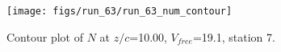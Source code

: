 \begin{figure}[H]
\centering
\texttt{[image: figs/run\_63/run\_63\_num\_contour]}
\caption{Contour plot of $N$ at $z/c$=10.00, $V_{free}$=19.1, station 7.}
\label{fig:run_63_num_contour}
\end{figure}



